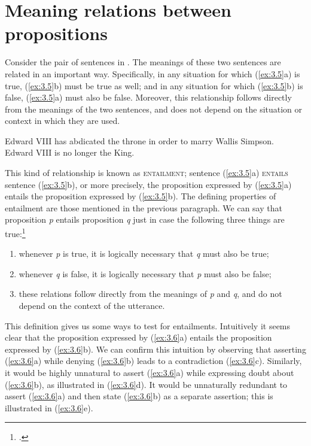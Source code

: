 \section{Meaning relations between propositions}\label{sec:3.3}

Consider the pair of sentences in . The meanings of these two sentences are related in an important way. Specifically, in any situation for which (\ref{ex:3.5}a) is true, (\ref{ex:3.5}b) must be true as well; and in any situation for which (\ref{ex:3.5}b) is false, (\ref{ex:3.5}a) must also be false. Moreover, this relationship follows directly from the meanings of the two sentences, and does not depend on the situation or context in which they are used.


\ea \label{ex:3.5}
\ea Edward VIII has abdicated the throne in order to marry Wallis Simpson.\\
\ex Edward VIII is no longer the King.
                       \z
\z


This kind of relationship is known as \textsc{entailment}; sentence (\ref{ex:3.5}a) \textsc{entails} sentence (\ref{ex:3.5}b), or more precisely, the proposition expressed by (\ref{ex:3.5}a) entails the proposition expressed by (\ref{ex:3.5}b). The defining properties of entailment are those mentioned in the previous paragraph. We can say that proposition \textit{p} entails proposition \textit{q} just in case the following three things are true:\footnote{\citet[29]{Cruse2000}.}


\begin{enumerate}[label=(\alph*)]
 \item whenever \textit{p} is true, it is logically necessary that \textit{q} must also be true;
 \item whenever \textit{q} is false, it is logically necessary that \textit{p} must also be false;
 \item these relations follow directly from the meanings of \textit{p} and \textit{q}, and do not depend on the context of the utterance.
\end{enumerate}

This definition gives us some ways to test for entailments. Intuitively it seems clear that the proposition expressed by (\ref{ex:3.6}a) entails the proposition expressed by (\ref{ex:3.6}b). We can confirm this intuition by observing that asserting (\ref{ex:3.6}a) while denying (\ref{ex:3.6}b) leads to a contradiction (\ref{ex:3.6}c). Similarly, it would be highly unnatural to assert (\ref{ex:3.6}a) while expressing doubt about (\ref{ex:3.6}b), as illustrated in (\ref{ex:3.6}d). It would be unnaturally redundant to assert (\ref{ex:3.6}a) and then state (\ref{ex:3.6}b) as a separate assertion; this is illustrated in (\ref{ex:3.6}e).


